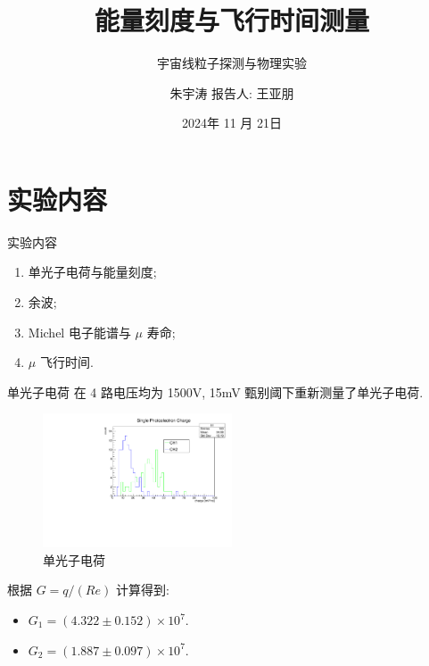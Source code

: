 \documentclass[10pt]{beamer}
\author{朱宇涛 \quad 报告人: 王亚朋}
\date{2024年 11 月 21日}
\title{能量刻度与飞行时间测量}
\subtitle{宇宙线粒子探测与物理实验}
\begin{document}
\maketitle
\section{实验内容}
\label{sec:org479bdd6}
\begin{frame}[label={sec:orgf2840f9}]{实验内容}
\begin{enumerate}
\item 单光子电荷与能量刻度;
\item 余波;
\item Michel 电子能谱与 \(\mu\) 寿命;
\item \(\mu\) 飞行时间.
\end{enumerate}
\end{frame}
\begin{frame}[label={sec:orgc3defc7}]{单光子电荷}
在 4 路电压均为 1500V, 15mV 甄别阈下重新测量了单光子电荷.
\begin{figure}[htbp]
\centering
\includegraphics[width=0.5\textwidth]{../../DetectorPerform/SPhoton/SphotonCharge.pdf}
\caption{单光子电荷}
\end{figure}
根据 \(G = q/(Re)\) 计算得到:
\begin{itemize}
\item \(G_1 = (4.322 \pm 0.152) \times 10^7\).
\item \(G_2 = (1.887 \pm 0.097) \times 10^7\).
\end{itemize}
\end{frame}
\end{document}
